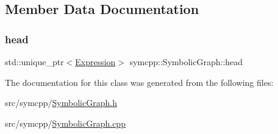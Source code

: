\subsection{Member Data Documentation}
\mbox{\label{classsymcpp_1_1SymbolicGraph_af7dd748252d7298792ff6329036de642}} 
\subsubsection{\texorpdfstring{head}{head}}
{\footnotesize\ttfamily std\+::unique\+\_\+ptr$<$\mbox{\hyperlink{classsymcpp_1_1Expression}{Expression}}$>$ symcpp\+::\+Symbolic\+Graph\+::head\hspace{0.3cm}{\ttfamily [private]}}



The documentation for this class was generated from the following files\+:\begin{DoxyCompactItemize}
\item 
src/symcpp/\mbox{\hyperlink{SymbolicGraph_8h}{Symbolic\+Graph.\+h}}\item 
src/symcpp/\mbox{\hyperlink{SymbolicGraph_8cpp}{Symbolic\+Graph.\+cpp}}\end{DoxyCompactItemize}
